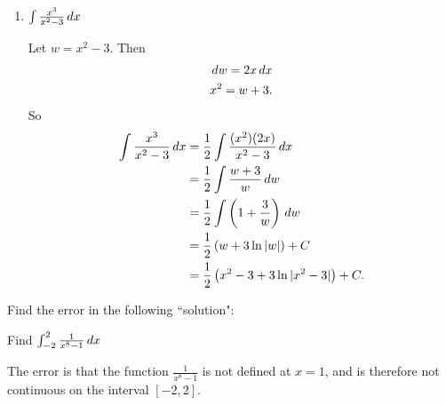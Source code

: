 \documentclass[handout,nooutcomes]{ximera}
\begin{document}
\begin{problem}
\begin{multicols}{2}
\begin{enumerate}
		
		
	\item  $\int \frac{x^3}{x^2 - 3} \,d x$
		\begin{freeResponse}
		Let $w = x^2 - 3$.  Then
			\begin{align*}
			&\,d w = 2x \,d x  \\
			&x^2 = w + 3.
			\end{align*}
		So
			\begin{align*}
			\int \frac{x^3}{x^2 - 3} \,d x &= \frac{1}{2} \int \frac{(x^2)(2x)}{x^2 - 3} \,d x  \\
			&= \frac{1}{2} \int \frac{w+3}{w} \,d w  \\
			&= \frac{1}{2} \int \left(1 + \frac{3}{w} \right) \,d w  \\
			&= \frac{1}{2} \left( w + 3 \ln|w| \right) + C  \\
			&= \frac{1}{2} \left( x^2 - 3 + 3\ln|x^2-3| \right) + C.
			\end{align*}
		\end{freeResponse}
		
		
		
	\end{enumerate}
	\end{multicols}
			
			
	
\end{problem}







\begin{problem}
Find the error in the following ``solution":

Find $\int_{-2}^2 \frac{1}{x^8 - 1} \,d x$


	\begin{freeResponse}
	The error is that the function $\frac{1}{x^8-1}$ is not defined at $x=1$, and is therefore not continuous on the interval $[-2,2]$.
	\end{freeResponse}

\end{problem}








	
	
	
	
	
	
	
	
	

	










								
				
				
	
\end{document}
